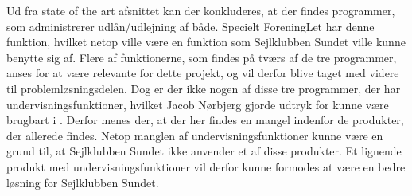Ud fra state of the art afsnittet kan der konkluderes, at der findes programmer, som administrerer udlån/udlejning af både.
Specielt ForeningLet har denne funktion, hvilket netop ville være en funktion som Sejlklubben Sundet ville kunne benytte sig af.
Flere af funktionerne, som findes på tværs af de tre programmer, anses for at være relevante for dette projekt, og vil derfor blive taget med videre til problemløsningsdelen.
Dog er der ikke nogen af disse tre programmer, der har undervisningsfunktioner, hvilket Jacob Nørbjerg gjorde udtryk for kunne være brugbart i . Derfor menes der, at der her findes en mangel indenfor de produkter, der allerede findes.
Netop manglen af undervisningsfunktioner kunne være en grund til, at Sejlklubben Sundet ikke anvender et af disse produkter.
Et lignende produkt med undervisningsfunktioner vil derfor kunne formodes at være en bedre løsning for Sejlklubben Sundet.

